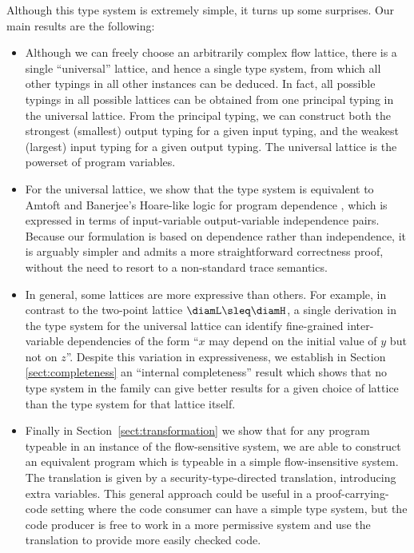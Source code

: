 \documentclass{sigplanconf}
\begin{document}
Although this type system is extremely simple, it turns up some surprises. 
Our main results are the following:
\begin{itemize}
\item Although we can freely choose an arbitrarily
  complex flow lattice, there is a single ``universal'' lattice, and hence
  a single type system, from which all other typings in all other
  instances can be deduced.
In fact, all possible typings in all possible lattices
  can be obtained from one 
  principal typing in the universal lattice.
  From the principal typing, we can construct both
  the strongest (smallest) output typing for a given input typing,
  and the weakest (largest) input typing for a given output typing.
  The universal lattice is the powerset of program variables. 
\item For the universal lattice, we show that the type system is
  equivalent to Amtoft and Banerjee's 
  Hoare-like logic for program dependence
  \cite{Amtoft:Banerjee:SAS04}, which is expressed in terms of
  input-variable output-variable independence pairs. Because our
  formulation is based on dependence rather than independence, it
  is arguably simpler and admits a more straightforward correctness
  proof, without the need to resort to a non-standard trace semantics.
\item In general, some lattices are more expressive than others.
    For example, in contrast to the two-point lattice $\diamL \sleq \diamH$,
  a single derivation in the type system for the universal lattice
    can identify fine-grained inter-variable dependencies of the form
  ``$x$ may depend on the initial value of $y$ but not on $z$''.
  Despite this variation in expressiveness, we establish in Section \ref{sect:completeness} 
  an ``internal completeness'' result which shows that no type system in the family
  can give better results for a given choice of lattice than the
  type system for that lattice itself.
\item Finally in Section~\ref{sect:transformation} we show that for any program
  typeable in an instance of the flow-sensitive system, we are able to
  construct an equivalent program which is typeable in a simple
  flow-insensitive system. The translation is given by a
  security-type-directed translation, introducing extra variables.
  This general approach could be useful in a proof-carrying-code
  setting where the code consumer can have a simple type system, but
  the code producer is free to work in a more permissive system and
  use the translation to provide more easily checked code.
\end{itemize}
\end{document}
